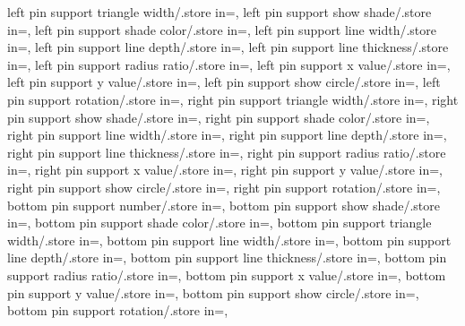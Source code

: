 {left pin support triangle width/.store in=\lefttriw,
left pin support show shade/.store in=\showleftpinsuppshade,
left pin support shade color/.store in=\leftpinsuppshadecolor,
left pin support line width/.store in=\leftlinew,
left pin support line depth/.store in=\leftlined,
left pin support line thickness/.store in=\leftlinet,
left pin support radius ratio/.store in=\leftradratio,
left pin support x value/.store in=\leftxvalue,
left pin support y value/.store in=\leftyvalue,
left pin support show circle/.store in=\leftshowcircle,
left pin support rotation/.store in=\leftrotpin,
right pin support triangle width/.store in=\righttriw,
right pin support show shade/.store in=\showrightpinsuppshade,
right pin support shade color/.store in=\rightpinsuppshadecolor,
right pin support line width/.store in=\rightlinew,
right pin support line depth/.store in=\rightlined,
right pin support line thickness/.store in=\rightlinet,
right pin support radius ratio/.store in=\rightradratio,
right pin support x value/.store in=\rightxvalue,
right pin support y value/.store in=\rightyvalue,
right pin support show circle/.store in=\rightshowcircle,
right pin support rotation/.store in=\rightrotpin,
bottom pin support number/.store in=\nbotpin,
bottom pin support show shade/.store in=\showbottompinsuppshade,
bottom pin support shade color/.store in=\bottompinsuppshadecolor,
bottom pin support triangle width/.store in=\bottomtriw,
bottom pin support line width/.store in=\bottomlinew,
bottom pin support line depth/.store in=\bottomlined,
bottom pin support line thickness/.store in=\bottomlinet,
bottom pin support radius ratio/.store in=\bottomradratio,
bottom pin support x value/.store in=\bottomxvalue,
bottom pin support y value/.store in=\bottomyvalue,
bottom pin support show circle/.store in=\bottomshowcircle,
bottom pin support rotation/.store in=\bottomrotpin,}
